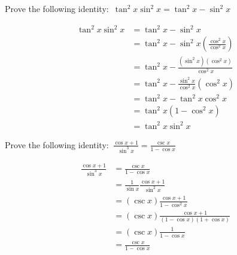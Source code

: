 \documentclass[addpoints]{exam}
\begin{document}
\begin{questions}
    \question Prove the following identity: $\displaystyle\, \tan^2 x \sin^2 x = \tan^2 x - \sin^2 x$ 
    \begin{solution}[\stretch{1}]
      \begin{align*}
        \tan^2 x \sin^2 x &= \tan^2 x - \sin^2 x \\ 
        &= \tan^2 x - \sin^2 x \left(\frac{\cos^2 x}{\cos^2 x}\right) \\ 
        &= \tan^2 x - \frac{\left(\sin^2 x\right)\left(\cos^2 x\right)}{\cos^2 x} \\ 
        &= \tan^2 x - \frac{\sin^2 x}{\cos^2 x}\left(\cos^2 x\right) \\ 
        &= \tan^2 x - \tan^2 x \cos^2 x \\ 
        &= \tan^2 x \left(1 - \cos^2 x\right) \\ 
        &= \tan^2 x \sin^2 x
      \end{align*}
    \end{solution}

    \question Prove the following identity: $\displaystyle\, \frac{\cos x + 1}{\sin^3 x} = \frac{\csc x}{1-\cos x}$ 
    \begin{solution}[\stretch{1}]
      \begin{align*}
        \frac{\cos x + 1}{\sin^3 x} &= \frac{\csc x}{1 - \cos x} \\
        &= \frac{1}{\sin x}\frac{\cos x + 1}{\sin ^2 x} \\ 
        &= \left(\csc x\right)\frac{\cos x + 1}{1 - \cos^2 x} \\ 
        &= \left(\csc x\right)\frac{\cos x + 1}{\left(1 - \cos x\right)\left(1 + \cos x\right)} \\ 
        &= \left(\csc x\right)\frac{1}{1 - \cos x} \\ 
        &= \frac{\csc x}{1 - \cos x}
      \end{align*}
    \end{solution}

    \newpage


\end{questions}
\end{document}
